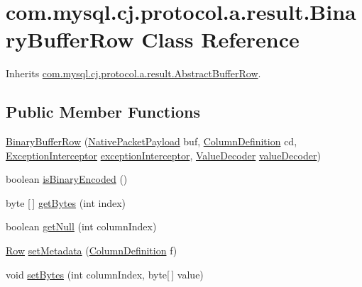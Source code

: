 \hypertarget{classcom_1_1mysql_1_1cj_1_1protocol_1_1a_1_1result_1_1_binary_buffer_row}{}\section{com.\+mysql.\+cj.\+protocol.\+a.\+result.\+Binary\+Buffer\+Row Class Reference}
\label{classcom_1_1mysql_1_1cj_1_1protocol_1_1a_1_1result_1_1_binary_buffer_row}


Inherits \mbox{\hyperlink{classcom_1_1mysql_1_1cj_1_1protocol_1_1a_1_1result_1_1_abstract_buffer_row}{com.\+mysql.\+cj.\+protocol.\+a.\+result.\+Abstract\+Buffer\+Row}}.

\subsection*{Public Member Functions}
\begin{DoxyCompactItemize}
\item 
\mbox{\hyperlink{classcom_1_1mysql_1_1cj_1_1protocol_1_1a_1_1result_1_1_binary_buffer_row_aad91e14d0208a114059292a386693301}{Binary\+Buffer\+Row}} (\mbox{\hyperlink{classcom_1_1mysql_1_1cj_1_1protocol_1_1a_1_1_native_packet_payload}{Native\+Packet\+Payload}} buf, \mbox{\hyperlink{interfacecom_1_1mysql_1_1cj_1_1protocol_1_1_column_definition}{Column\+Definition}} cd, \mbox{\hyperlink{interfacecom_1_1mysql_1_1cj_1_1exceptions_1_1_exception_interceptor}{Exception\+Interceptor}} \mbox{\hyperlink{classcom_1_1mysql_1_1cj_1_1protocol_1_1result_1_1_abstract_resultset_row_a50c0daccb2e9e7e2445af4a09d6fb9d0}{exception\+Interceptor}}, \mbox{\hyperlink{interfacecom_1_1mysql_1_1cj_1_1protocol_1_1_value_decoder}{Value\+Decoder}} \mbox{\hyperlink{classcom_1_1mysql_1_1cj_1_1protocol_1_1result_1_1_abstract_resultset_row_a62b113b0142a35b7962695b43b5b8e22}{value\+Decoder}})
\item 
boolean \mbox{\hyperlink{classcom_1_1mysql_1_1cj_1_1protocol_1_1a_1_1result_1_1_binary_buffer_row_a699d5aa259fbe51d4478babc94d39090}{is\+Binary\+Encoded}} ()
\item 
byte \mbox{[}$\,$\mbox{]} \mbox{\hyperlink{classcom_1_1mysql_1_1cj_1_1protocol_1_1a_1_1result_1_1_binary_buffer_row_a2d51fe0441a52cbc0d93b23a5c1c0364}{get\+Bytes}} (int index)
\item 
boolean \mbox{\hyperlink{classcom_1_1mysql_1_1cj_1_1protocol_1_1a_1_1result_1_1_binary_buffer_row_af16fb029bdd91774e95d8ee502a85e07}{get\+Null}} (int column\+Index)
\item 
\mbox{\hyperlink{interfacecom_1_1mysql_1_1cj_1_1result_1_1_row}{Row}} \mbox{\hyperlink{classcom_1_1mysql_1_1cj_1_1protocol_1_1a_1_1result_1_1_binary_buffer_row_a2bd5930ed5755dca5600e9ee96bad328}{set\+Metadata}} (\mbox{\hyperlink{interfacecom_1_1mysql_1_1cj_1_1protocol_1_1_column_definition}{Column\+Definition}} f)
\item 
void \mbox{\hyperlink{classcom_1_1mysql_1_1cj_1_1protocol_1_1a_1_1result_1_1_binary_buffer_row_ab30b2392287e18d1a0d7662a3090493a}{set\+Bytes}} (int column\+Index, byte\mbox{[}$\,$\mbox{]} value)
\end{DoxyCompactItemize}
